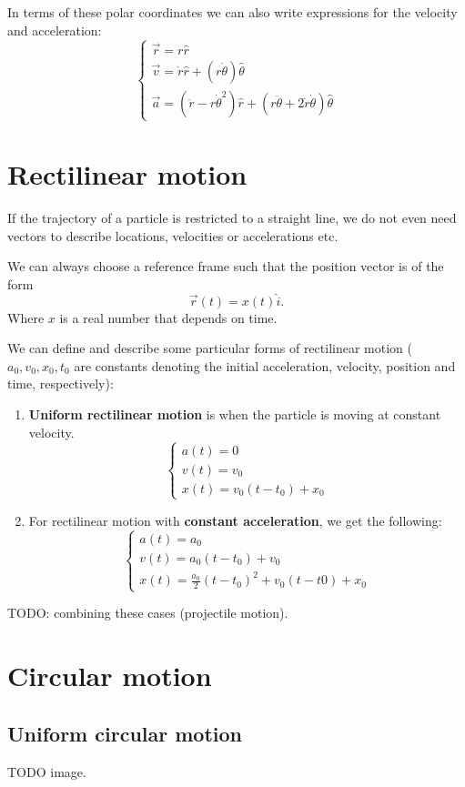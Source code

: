 In terms of these polar coordinates we can also write expressions for the velocity and acceleration:
\[ \begin{cases}
\vec{r} = r \hat{r} \\
\vec{v} = \dot{r}\hat{r} + (r\dot{\theta})\hat{\theta} \\
\vec{a} = \left(\ddot{r}-r\dot{\theta}^2\right)\hat{r} + \left(r\ddot{\theta} + 2\dot{r}\dot{\theta}\right)\hat{\theta}
\end{cases} \]

\section{Rectilinear motion}
If the trajectory of a particle is restricted to a straight line, we do not even need vectors to describe locations, velocities or accelerations etc.

We can always choose a reference frame such that the position vector is of the form
\[ \vec{r}(t) = x(t)\hat{i}. \]
Where $x$ is a real number that depends on time.

We can define and describe some particular forms of rectilinear motion ($a_0, v_0, x_0, t_0$ are constants denoting the initial acceleration, velocity, position and time, respectively):
\begin{enumerate}
\item \textbf{Uniform rectilinear motion} is when the particle is moving at constant velocity.
\[ \begin{cases}
a(t) = 0 \\
v(t) = v_0 \\
x(t) = v_0(t-t_0) + x_0
\end{cases} \]
\item For rectilinear motion with \textbf{constant acceleration}, we get the following:
\[ \begin{cases}
a(t) = a_0 \\
v(t) = a_0(t-t_0) + v_0 \\
x(t) = \frac{a_0}{2}(t-t_0)^2 + v_0(t-t0) + x_0
\end{cases} \]
\end{enumerate}

TODO: combining these cases (projectile motion).

\section{Circular motion}
\subsection{Uniform circular motion}
TODO image.

